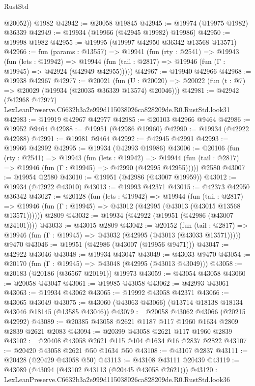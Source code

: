 \begin{lexlean}{RustStd}
\begin{coremodule}
        @20052))
    @1982
@42942 := @20058 @19845
@42945 := @19974 (@19975 @1982) @36339
@42949 := @19934 (@19966 (@42945 @19982) @19986)
@42950 := @19998 @1982
@42955 := @19995 (@19997 @42950 @36342 @13568 @13571)
@42966 := fun (params : @13557) =>
  @19941
    (fun (rty : @2541) =>
    @19943
      (fun (lets : @19942) =>
      @19944 (fun (tail : @2817) => @19946 (fun (Γ : @19945) => @42924 (@42949 @42955)))))
@42967 := @19940 @42966
@42968 := @19938 @42967
@42977 := @20021
    (fun (U : @20020) => @20022 (fun (t : @7) => @20029 (@19934 (@20035 @36339 @13574) @20046)))
@42981 := @42942 (@42968 @42977) LexLeanPreserve.C6632b3a2e999d115038026ca828209de.R0.RustStd.look31
@42983 := @19919 @42967 @42977
@42985 := @20103 @42966 @9464
@42986 := @19952 @9464
@42988 := @19951 (@42986 @19960)
@42990 := @19934 (@42922 @42988)
@42991 := @19981 @9464
@42992 := @42945 @42991
@42993 := @19966 @42992
@42995 := @19934 (@42993 @19986)
@43006 := @20106
    (fun (rty : @2541) =>
    @19943
      (fun (lets : @19942) =>
      @19944 (fun (tail : @2817) => @19946 (fun (Γ : @19945) => @42990 (@42995 @42955)))))
    @2580
@43007 := @19954 @2580
@43010 := @19951 (@42986 (@43007 @19959))
@43012 := @19934 (@42922 @43010)
@43013 := @19993 @42371
@43015 := @42373 @42950 @36342
@43027 := @20128
    (fun (lets : @19942) =>
    @19944
      (fun (tail : @2817) =>
      @19946 (fun (Γ : @19945) => @43012 (@42995 (@43013 (@43015 @13568 @13571))))))
    @2809
@43032 := @19934 (@42922 (@19951 (@42986 (@43007 @24101))))
@43033 := @43015 @2809
@43042 := @20152
    (fun (tail : @2817) => @19946 (fun (Γ : @19945) => @43032 (@42995 (@43013 (@43033 @13571)))))
    @9470
@43046 := @19951 (@42986 (@43007 (@19956 @9471)))
@43047 := @42922 @43046
@43048 := @19934 @43047
@43049 := @43033 @9470
@43054 := @20170 (fun (Γ : @19945) => @43048 (@42995 (@43013 @43049)))
@43058 := @20183 (@20186 (@36567 @20191)) @19973
@43059 := @43054 @43058
@43060 := @20058 @43047
@43061 := @19985 @43058
@43062 := @42993 @43061
@43063 := @19934 @43062
@43065 := @19992 @43058 @42371
@43066 := @43065 @43049
@43075 := @43060 (@43063 @43066) (@13714 @18138 @18134 @43046 @18145 (@13585 @43046))
@43079 := @20058 @43062 @43066 (@20215 @42992)
@43089 := @20385 @43058 @2621 @1187 @117 @1960 @1634 @2809 @2839 @2621 @2083
@43094 := @20399 @43058 @2621 @117 @1960 @2839
@43102 := @20408 @43058 @2621 @115 @104 @1634 @16 @2837 @2822
@43107 := @20420 @43058 @2621 @50 @1634 @50
@43108 := @43107 @2837
@43111 := @20428 (@20429 @43058 @50)
@43113 := @43108 @43111 @20439
@43119 := @43089 (@43094 (@43102 @43113 (@20445 @43058 @2621)))
@43120 := LexLeanPreserve.C6632b3a2e999d115038026ca828209de.R0.RustStd.look36

\end{coremodule}
\end{lexlean}
